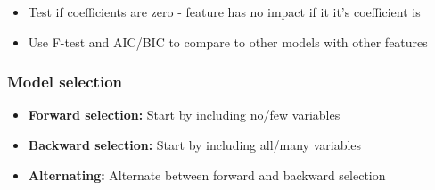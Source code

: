 \documentclass{article}
\begin{document}
\begin{itemize}
    \item Test if coefficients are zero - feature has no impact if it it's coefficient is
    \item Use F-test and AIC/BIC to compare to other models with other features
\end{itemize}

\subsubsection{Model selection}

\begin{itemize}
    \item \textbf{Forward selection:} Start by including no/few variables
    \item \textbf{Backward selection:} Start by including all/many variables
    \item \textbf{Alternating:} Alternate between forward and backward selection
\end{itemize}

\pagebreak
\end{document}
